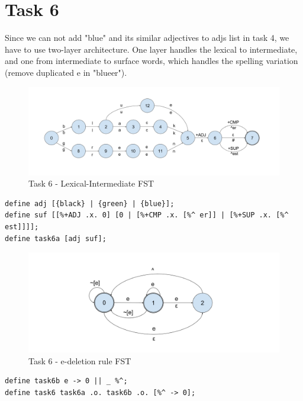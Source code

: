 \documentclass[]{article}
\begin{document}
\section{Task 6}

Since we can not add "blue" and its similar adjectives to adjs list in task 4, we have to use two-layer architecture. One layer handles the lexical to intermediate, and one from intermediate to surface words, which handles the spelling variation (remove duplicated e in "blueer").

\begin{figure}[H]
	\centering
	\includegraphics[scale=0.27]{xfst-task6a}
	\caption{Task 6 - Lexical-Intermediate FST}
	\label{fig:xfst-task6a}
\end{figure}

\begin{lstlisting}
define adj [{black} | {green} | {blue}];
define suf [[%+ADJ .x. 0] [0 | [%+CMP .x. [%^ er]] | [%+SUP .x. [%^ est]]]];
define task6a [adj suf];
\end{lstlisting}

\begin{figure}[H]
	\centering
	\includegraphics[scale=0.27]{xfst-task6b}
	\caption{Task 6 - e-deletion rule FST}
	\label{fig:xfst-task6b}
\end{figure}

\begin{lstlisting}
define task6b e -> 0 || _ %^;
define task6 task6a .o. task6b .o. [%^ -> 0];
\end{lstlisting}
\end{document}
